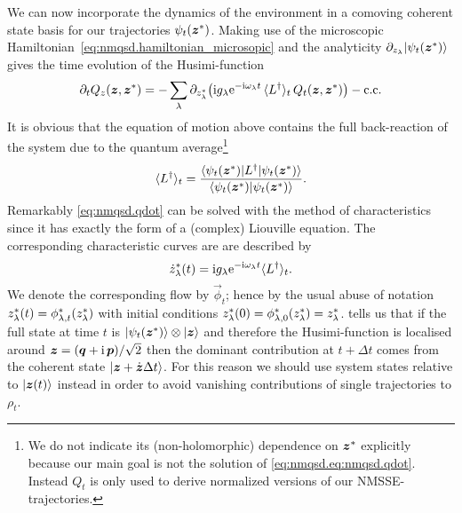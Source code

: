We can now incorporate the dynamics of the environment in a comoving coherent state basis for our trajectories $\psi_t({\boldsymbol{z}}^*)$.
Making use of the microscopic Hamiltonian~\ref{eq:nmqsd.hamiltonian_microsopic} and the analyticity $\partial_{z_\lambda} | \psi_t({\boldsymbol{z}}^*) \rangle$ gives the time evolution of the Husimi-function
\begin{equation}
  \partial_t Q_z(\zz, \cc\zz) = - \sum_\lambda \partial_{\cc z_\lambda} \big( \ii g_\lambda \exp[-\ii \omega_\lambda t] \, \qmean{\adj L}_t \, Q_t(\zz, \cc\zz) \big) - \mathrm{c.c.}
  \label{eq:nmqsd.qdot}
\end{equation}
It is obvious that the equation of motion above contains the full back-reaction of the system due to the quantum average\footnote{We do not indicate its (non-holomorphic) dependence on ${\boldsymbol{z}}^*$ explicitly because our main goal is not the solution of \autoref{eq:nmqsd.eq:nmqsd.qdot}. Instead $Q_t$ is only used to derive normalized versions of our NMSSE-trajectories.}
\begin{equation*}
  \langle L^\dagger \rangle_t = \frac{\langle \psi_t({\boldsymbol{z}}^*) | L^\dagger | \psi_t({\boldsymbol{z}}^*) \rangle}{\langle \psi_t({\boldsymbol{z}}^*) | \psi_t({\boldsymbol{z}}^*) \rangle}.
\end{equation*}
Remarkably \autoref{eq:nmqsd.qdot} can be solved with the method of characteristics since it has exactly the form of a (complex) Liouville equation.
The corresponding characteristic curves are are described by
\begin{equation}
  \cc{\dot z}_\lambda(t) = \ii g_\lambda \exp[-\ii \omega_\lambda t] \qmean{\adj L}_t.
  \label{eq:nmqsd.zdot}
\end{equation}
We denote the corresponding flow by $\vec\phi_t$; hence by the usual abuse of notation ${z}^*_\lambda(t) = {\phi}^*_{\lambda,t}({z}^*_\lambda)$ with initial conditions ${z}^*_\lambda(0) = {\phi}^*_{\lambda, 0}({z}^*_\lambda) = {z}^*_\lambda$.
 tells us that if the full state at time $t$ is $| \psi_t({\boldsymbol{z}}^*) \rangle \otimes | \boldsymbol{z} \rangle$ and therefore the Husimi-function is localised around $\boldsymbol{z} = (\boldsymbol{q} + \mathrm{i} \, \boldsymbol{p}) / \sqrt{2}$ then the dominant contribution at $t + \Delta t$ comes from the coherent state $| \boldsymbol{z} + \dot{\boldsymbol{z}} \Delta t \rangle$.
For this reason we should use system states relative to $| \boldsymbol{z}(t) \rangle$ instead in order to avoid vanishing contributions of single trajectories to $\rho_t$.

